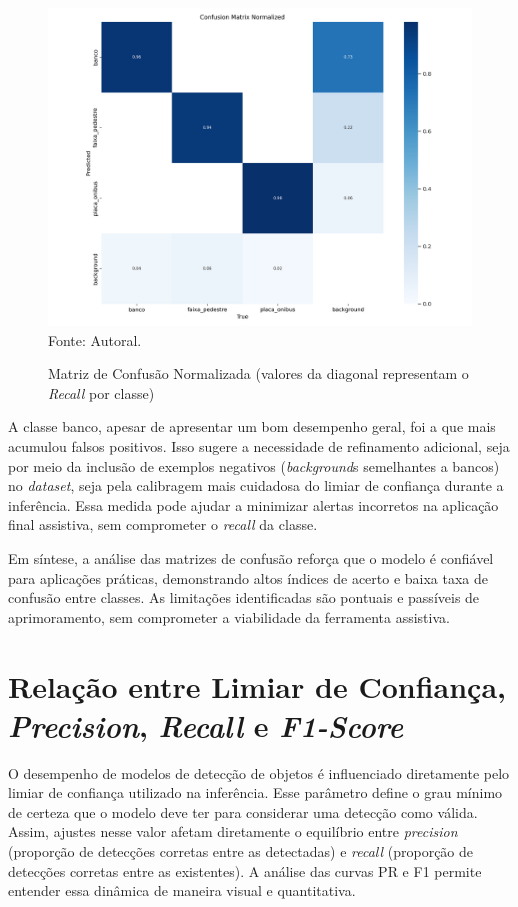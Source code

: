 \begin{figure}[htbp]
  \centering
  \caption{Matriz de Confusão Normalizada (valores da diagonal representam o \textit{Recall} por classe)}
  \includegraphics[width=1\textwidth]{Figuras/confusion_matrix_normalized.png}
  \\
  Fonte: Autoral.
  \label{fg-confusion_matrix_normalized}
\end{figure}

A classe banco, apesar de apresentar um bom desempenho geral, foi a que mais acumulou falsos positivos. Isso sugere a necessidade de refinamento adicional, seja por meio da inclusão de exemplos negativos (\textit{background}s semelhantes a bancos) no \textit{dataset}, seja pela calibragem mais cuidadosa do limiar de confiança durante a inferência. Essa medida pode ajudar a minimizar alertas incorretos na aplicação final assistiva, sem comprometer o \textit{recall} da classe.

Em síntese, a análise das matrizes de confusão reforça que o modelo é confiável para aplicações práticas, demonstrando altos índices de acerto e baixa taxa de confusão entre classes. As limitações identificadas são pontuais e passíveis de aprimoramento, sem comprometer a viabilidade da ferramenta assistiva.


\section{\textbf{Relação entre Limiar de Confiança, \textit{Precision}, \textit{Recall} e \textit{F1-Score}}}

O desempenho de modelos de detecção de objetos é influenciado diretamente pelo limiar de confiança utilizado na inferência. Esse parâmetro define o grau mínimo de certeza que o modelo deve ter para considerar uma detecção como válida. Assim, ajustes nesse valor afetam diretamente o equilíbrio entre \textit{precision} (proporção de detecções corretas entre as detectadas) e \textit{recall} (proporção de detecções corretas entre as existentes). A análise das curvas PR e F1 permite entender essa dinâmica de maneira visual e quantitativa.

